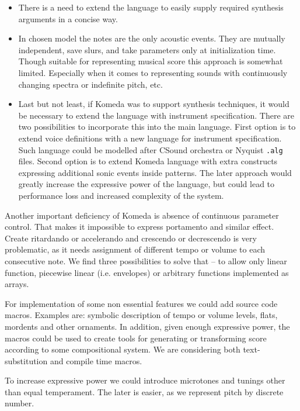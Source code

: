 \documentclass{article}
\begin{document}
\begin{itemize}
  \item There is a need to extend the language to easily supply required
    synthesis arguments in a concise way.

  \item In chosen model the notes are the only acoustic events. They are
    mutually independent, save slurs, and take parameters only at
    initialization time. Though suitable for representing musical score this
    approach is somewhat limited. Especially when it comes to representing
    sounds with continuously changing spectra or indefinite pitch, etc. 	

  \item Last but not least, if Komeda was to support synthesis techniques, it
    would be necessary to extend the language with instrument specification.
    There are two possibilities to incorporate this into the main language.
    First option is to extend voice definitions with a new language for
    instrument specification. Such language could be modelled after CSound
    orchestra \cite{csound} or Nyquist {\tt .alg} \cite{alg} files. Second
    option is to extend Komeda language with extra constructs expressing
    additional sonic events inside patterns. The later approach would greatly
    increase the expressive power of the language, but could lead to
    performance loss and increased complexity of the system. 
\end{itemize}

Another important deficiency of Komeda is absence of continuous parameter
control. That makes it impossible to express portamento and similar effect.
Create ritardando or accelerando and crescendo or decrescendo is very
problematic, as it needs assignment of different tempo or volume to each
consecutive note. We find three possibilities to solve that -- to allow only
linear function, piecewise linear (i.e. envelopes) or arbitrary functions
implemented as arrays.

For implementation of some non essential features we could add source code
macros.  Examples are: symbolic description of tempo or volume levels, flats,
mordents and other ornaments.  In addition, given enough expressive power, the
macros could be used to create tools for generating or transforming score
according to some compositional system. We are considering both
text-substitution and compile time macros.

To increase expressive power we could introduce microtones and tunings other
than equal temperament.  The later is easier, as we represent pitch by discrete
number.
\end{document}
